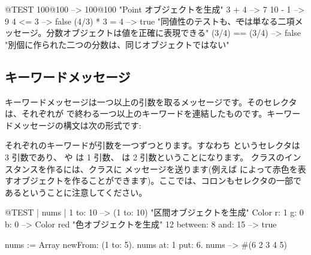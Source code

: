 \documentclass[a4paper,10pt,twoside]{book}
\begin{document}
\begin{code}{@TEST}
100@100      --> 100@100  "Point オブジェクトを生成"
3 + 4              --> 7
10 - 1            --> 9
4 <= 3            --> false
(4/3) * 3 = 4   --> true  "同値性のテストも、\st では単なる二項メッセージ。分数オブジェクトは値を正確に表現できる"
(3/4) == (3/4) --> false  "別個に作られた二つの分数は、同じオブジェクトではない"
\end{code}


\subsection{キーワードメッセージ}

キーワードメッセージは一つ以上の引数を取るメッセージです。そのセレクタは、それぞれが \ct{:} で終わる一つ以上のキーワードを連結したものです。キーワードメッセージの構文は次の形式です:

それぞれのキーワードが引数を一つずつとります。すなわち というセレクタは 3 引数であり、 や  は 1 引数、 は 2 引数ということになります。 クラスのインスタンスを作るには、クラスに  メッセージを送ります(例えば  によって赤色を表すオブジェクトを作ることができます)。ここでは、コロンもセレクタの一部であるということに注意してください。


\begin{code}{@TEST | nums |}
1 to: 10                        --> (1 to: 10)  "区間オブジェクトを生成"
Color r: 1 g: 0 b: 0       --> Color red  "色オブジェクトを生成"
12 between: 8 and: 15 --> true

nums := Array newFrom: (1 to: 5).
nums at: 1 put: 6.
nums --> #(6 2 3 4 5)
\end{code}
\end{document}
